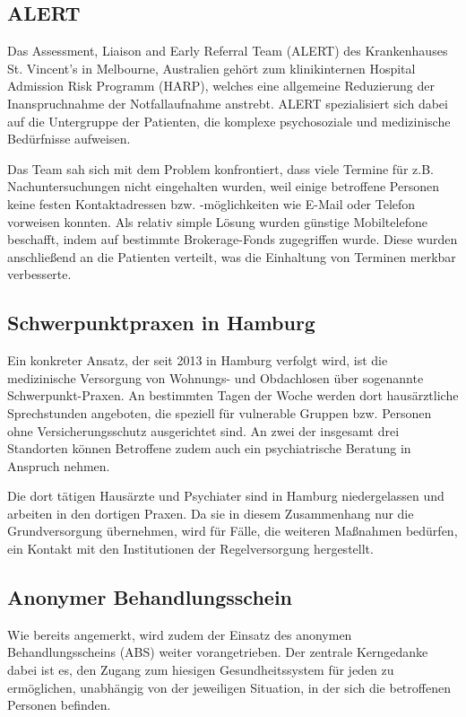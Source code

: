 \subsection{ALERT}

Das Assessment, Liaison and Early Referral Team (ALERT) des Krankenhauses St. Vincent's in Melbourne, Australien gehört zum klinikinternen Hospital Admission Risk Programm (HARP), welches eine allgemeine Reduzierung der Inanspruchnahme der Notfallaufnahme anstrebt. ALERT spezialisiert sich dabei auf die Untergruppe der Patienten, die komplexe psychosoziale und medizinische Bedürfnisse aufweisen.

Das Team sah sich mit dem Problem konfrontiert, dass viele Termine für z.B. Nachuntersuchungen nicht eingehalten wurden, weil einige betroffene Personen keine festen Kontaktadressen bzw. -möglichkeiten wie E-Mail oder Telefon vorweisen konnten. Als relativ simple Lösung wurden günstige Mobiltelefone beschafft, indem auf bestimmte Brokerage-Fonds zugegriffen wurde. Diese wurden anschließend an die Patienten verteilt, was die Einhaltung von Terminen merkbar verbesserte. \citep{Davies.2018}

\subsection{Schwerpunktpraxen in Hamburg}

Ein konkreter Ansatz, der seit 2013 in Hamburg verfolgt wird, ist die medizinische Versorgung von Wohnungs- und Obdachlosen über sogenannte Schwerpunkt-Praxen. An bestimmten Tagen der Woche werden dort hausärztliche Sprechstunden angeboten, die speziell für vulnerable Gruppen bzw. Personen ohne Versicherungsschutz ausgerichtet sind. An zwei der insgesamt drei Standorten können Betroffene zudem auch ein psychiatrische Beratung in Anspruch nehmen.

Die dort tätigen Hausärzte und Psychiater sind in Hamburg niedergelassen und arbeiten in den dortigen Praxen. Da sie in diesem Zusammenhang nur die Grundversorgung übernehmen, wird für Fälle, die weiteren Maßnahmen bedürfen, ein Kontakt mit den Institutionen der Regelversorgung hergestellt. \citep{Leeden.2023}

\subsection{Anonymer Behandlungsschein}

Wie bereits angemerkt, wird zudem der Einsatz des anonymen Behandlungsscheins (\acs{ABS}) weiter vorangetrieben. Der zentrale Kerngedanke dabei ist es, den Zugang zum hiesigen Gesundheitssystem für jeden zu ermöglichen, unabhängig von der jeweiligen Situation, in der sich die betroffenen Personen befinden. 

